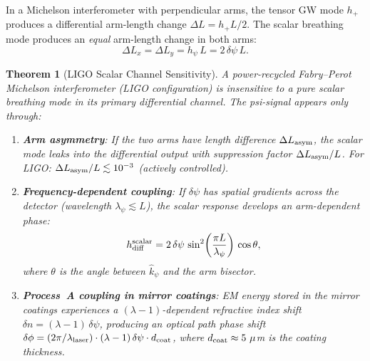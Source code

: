 \documentclass[11pt]{article}
\newcommand{\lam}{\lambda}
\newtheorem{theorem}{Theorem}[section]
\theoremstyle{definition}
\theoremstyle{remark}
\begin{document}
In a Michelson interferometer with perpendicular arms, the tensor GW mode
$h_+$ produces a differential arm-length change $\Delta L = h_+ L/2$.
The scalar breathing mode produces an \emph{equal} arm-length change in
both arms:
\begin{equation}
\Delta L_x = \Delta L_y = h_\psi\,L = 2\,\delta\psi\,L.
\label{eq:common_mode}
\end{equation}

\begin{theorem}[LIGO Scalar Channel Sensitivity]
\label{thm:ligo_scalar}
A power-recycled Fabry--Perot Michelson interferometer (LIGO
configuration) is \emph{insensitive} to a pure scalar breathing mode
in its primary differential channel. The psi-signal appears only
through:
\begin{enumerate}[nosep]
\item \textbf{Arm asymmetry}: If the two arms have length difference
  $\Delta L_{\rm asym}$, the scalar mode leaks into the differential
  output with suppression factor $\Delta L_{\rm asym}/L$.
  For LIGO: $\Delta L_{\rm asym}/L \lesssim 10^{-3}$
  (actively controlled).
\item \textbf{Frequency-dependent coupling}: If $\delta\psi$ has
  spatial gradients across the detector (wavelength $\lambda_\psi
  \lesssim L$), the scalar response develops an arm-dependent phase:
  \begin{equation}
  h_{\rm diff}^{\rm scalar} = 2\,\delta\psi\,\sin^2\!\left(
  \frac{\pi L}{\lambda_\psi}\right)\,\cos\theta,
  \end{equation}
  where $\theta$ is the angle between $\hat{k}_\psi$ and the
  arm bisector.
\item \textbf{Process~A coupling in mirror coatings}: EM energy stored
  in the mirror coatings experiences a $(\lam-1)$-dependent refractive
  index shift $\delta n = (\lam-1)\,\delta\psi$, producing an optical
  path phase shift $\delta\phi = (2\pi/\lambda_{\rm laser})\cdot
  (\lam-1)\,\delta\psi\cdot d_{\rm coat}$, where $d_{\rm coat}
  \approx 5~\mu$m is the coating thickness.
\end{enumerate}
\end{theorem}
\end{document}
